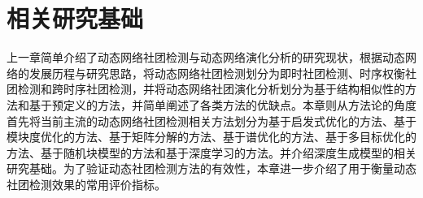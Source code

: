 \baselineskip 20pt

\chapter{相关研究基础}
\label{chap:2}
上一章简单介绍了动态网络社团检测与动态网络演化分析的研究现状，根据动态网络的发展历程与研究思路，将动态网络社团检测划分为即时社团检测、时序权衡社团检测和跨时序社团检测，并将动态网络社团演化分析划分为基于结构相似性的方法和基于预定义的方法，并简单阐述了各类方法的优缺点。本章则从方法论的角度首先将当前主流的动态网络社团检测相关方法划分为基于启发式优化的方法、基于模块度优化的方法、基于矩阵分解的方法、基于谱优化的方法、基于多目标优化的方法、基于随机块模型的方法和基于深度学习的方法。并介绍深度生成模型的相关研究基础。为了验证动态社团检测方法的有效性，本章进一步介绍了用于衡量动态社团检测效果的常用评价指标。

